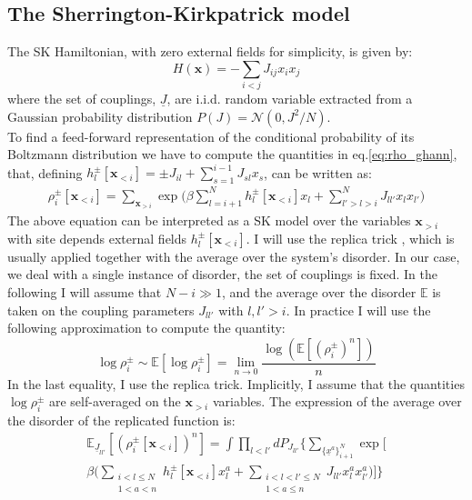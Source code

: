 \documentclass[aps,physrev,10pt,floatfix,reprint]{revtex4-2}
\begin{document}
\subsection{The Sherrington-Kirkpatrick model}
\label{sec:SK}
The SK Hamiltonian, with zero external fields for simplicity, is given by:
\begin{equation}
H\left(\mathbf{x}\right)=-\sum_{i<j}J_{ij}x_{i}x_{j}
\end{equation}
where the set of couplings, $\underline{J}$, are i.i.d. random variable extracted from a Gaussian probability distribution $P(J)= \mathcal{N}(0, J^2/N)$. \\
To find a feed-forward representation of the conditional probability of its Boltzmann distribution we have to compute the quantities in eq.\ref{eq:rho_ghann}, that, defining $h_l^{\pm}[\mathbf{x}_{<i}] =\pm J_{il} + \sum_{s=1}^{i-1} J_{sl} x_s$, can be written as:
\begin{align*}
    \rho_i^{\pm} [\mathbf{x}_{<i}]  = \sum_{\mathbf{x}_{>i}}  \exp \bigg(
    \beta\sum_{l=i+1}^{N} h_l^{\pm}[\mathbf{x}_{<i}] x_l
    + \sum_{l'>l>i}^{N} J_{ll'} x_l x_{l'} \bigg)
\end{align*}
The above equation can be interpreted as a SK model over the variables $\mathbf{x}_{>i}$ with site depends external fields $h_l^{\pm}[\mathbf{x}_{<i}]$. 
I will use the replica trick \cite{10.1142/0271}, which is usually applied together with the average over the system's disorder. In our case, we deal with a single instance of disorder, the set of couplings is fixed. In the following I will assume that $N-i \gg 1$, and the average over the disorder $\mathbb{E}$ is taken on the coupling parameters $J_{ll'}$ with $l,l'>i$. In practice I will use the following approximation to compute the quantity:
\[
\log\rho_i^{\pm} \sim \mathbb{E}\left[  \log\rho_i^{\pm} \right] = \lim_{n\rightarrow 0} \frac{  \log(\mathbb{E}\left[(\rho_i^{\pm})^n \right])}{n}
\]
In the last equality, I use the replica trick. 
Implicitly, I assume that the quantities $\log\rho_i^{\pm}$ are self-averaged on the $\mathbf{x}_{>i}$ variables.
 The expression of the average over the disorder of the replicated function is:
\begin{multline}
\mathbb{E}_{\underline{J}_{ll'}}\left[(\rho_i^{\pm}[\mathbf{x}_{<i}])^n \right]  = 
\int \prod_{l<l'} dP_{J_{ll'}} \bigg\{ 
\sum_{\{\underline{x}^{a}\}_{i+1}^N} \exp\bigg[\\ \beta \bigg( 
\sum_{\substack{i<l \le N\\ 1<a<n}}h_l^{\pm}[\mathbf{x}_{<i}] x_l^{a} + 
\sum_{\substack{i < l< l' \le N\\ 1<a \le n}} J_{ll'} x_l^{a} x_{l'}^{a}
\bigg)  \bigg] 
\bigg\}
\end{multline}
\end{document}
